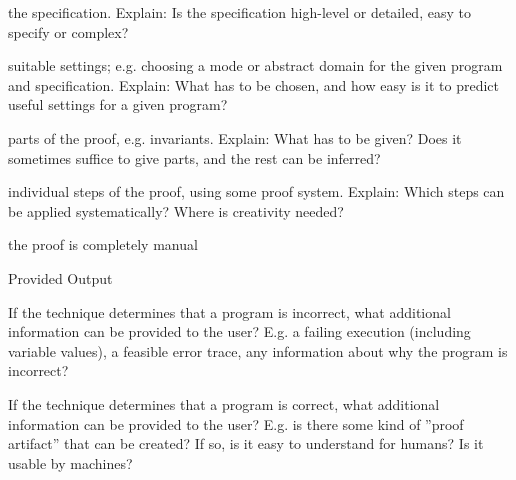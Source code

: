 \documentclass[a4paper]{article}
\begin{document}
\begin{minipage}[t]{0.16\linewidth}
\begin{betterlist}
\begin{betterlist}
			\item \checkboxHalfChecked the specification. Explain: Is the specification high-level or detailed, easy to specify or complex?

			\item \checkboxUnchecked suitable settings; e.g. choosing a mode or abstract domain for the given program and specification. Explain: What has to be chosen, and how easy is it to predict useful settings for a given program?

			\item \checkboxUnchecked parts of the proof, e.g. invariants. Explain: What has to be given? Does it sometimes suffice to give parts, and the rest can be inferred?
			\item \checkboxUnchecked individual steps of the proof, using some proof system. Explain: Which steps can be applied systematically? Where is creativity needed?
			\item \checkboxUnchecked the proof is completely manual
		\end{betterlist}
		\item \alert{Provided Output}
		\begin{betterlist}
			\item If the technique determines that a program is incorrect, what additional information can be provided to the user? E.g. a failing execution (including variable values), a feasible error trace, any information about why the program is incorrect?

			\item If the technique determines that a program is correct, what additional information can be provided to the user? E.g. is there some kind of ”proof artifact” that can be created? If so, is it easy to understand for humans? Is it usable by machines?


\end{betterlist}
\end{betterlist}
\end{minipage}
\end{document}

